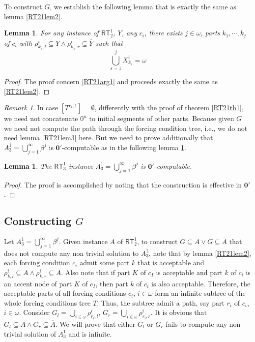 \documentclass[options]{amsart}
\newtheorem{lemma}[theorem]{Lemma}
\theoremstyle{definition}
\theoremstyle{remark}
\newtheorem{remark}[theorem]{Remark}
\newtheorem{Ramsey's theorem}[theorem]{Ramsey's theorem}
\begin{document}
To construct $G$,
we establish the following lemma
that is exactly the same as
lemma \ref{RT21lem2}.
\begin{lemma}\label{RT21lem6}
For any instance of $\mathsf{RT}^1_2$,
$Y$, any
$c_i$, there exists
$j\in \omega$,
parts $k_1,\cdots,k_{j}$
of $c_i$
with
$\rho^i_{k_s,l}
\subseteq Y\wedge
\rho^i_{k_s,r}
\subseteq \overline{Y}$
such that
\[
\bigcup\limits_{s=1}^j
X^i_{k_s}=\omega
\]

\end{lemma}
\begin{proof}
The proof concern \ref{RT21arg1}
and proceeds
exactly the same as \ref{RT21lem2}.
\end{proof}

\begin{remark}
In case
$[T^{c_i,1}]=\emptyset$,
differently
with the proof of theorem \ref{RT21th1},
we need not concatenate $0^n$ to
initial segments of other parts. Because
given $G$ we need not compute the
path through the forcing condition tree,
i.e., we do not need lemma \ref{RT21lem3}
here. But we need to prove additionally
that $A_3^1 = \bigcup\limits_{j=1}^\infty
\beta^j$ is $\mathbf{0}'$-computable
as in the following lemma \ref{RT21lem9}.

\end{remark}

\begin{lemma}\label{RT21lem9}
The $\mathsf{RT}_3^1$
instance $A_3^1 = \bigcup\limits_{j=1}^\infty
\beta^j$ is $\mathbf{0}'$-computable.

\end{lemma}
\begin{proof}
The proof is accomplished by noting
that the construction is effective in
$\mathbf{0}'$.
\end{proof}

\subsection{Constructing  $G$}
Let
$A_3^1 = \bigcup\limits_{j=1}^\infty
\beta^j$.
Given instance $A$ of
$\mathsf{RT}_2^1$, to construct
 $G\subseteq A\vee G\subseteq
\overline{A}$ that does not compute
any non trivial solution to $A_3^1$,
note that by lemma \ref{RT21lem2},
each forcing condition
$c_i$ admit some part $k$ that is
acceptable and
$\rho^i_{k,l}\subseteq
A\wedge \rho^i_{k,r}\subseteq
\overline{A}$. Also note that
if part $K$ of $c_I$ is acceptable
and part $k$ of $c_i$ is
an accent node of part $K$ of $c_I$,
 then part $k$ of $c_i$ is also
 acceptable.
 Therefore, the acceptable parts
 of all forcing conditions $c_i$,
 $i\in\omega$ form an infinite
 subtree of the whole forcing
 conditions tree $T$. Thus,
 the subtree admit a path, say
 part $r_i$ of $c_i$, $i\in\omega$.
 Consider
 $G_l=\bigcup\limits_{i\in\omega}
 \rho^i_{r_i,l}$,
 $G_r=\bigcup\limits_{i\in\omega}
 \rho^i_{r_i,r}$. It is obvious
 that $G_l\subseteq A\wedge
 G_r\subseteq \overline{A}$.
We will prove that either $G_l$
or $G_r$ fails to compute
any non trivial solution of $A_3^1$ and is infinite.
\end{document}
